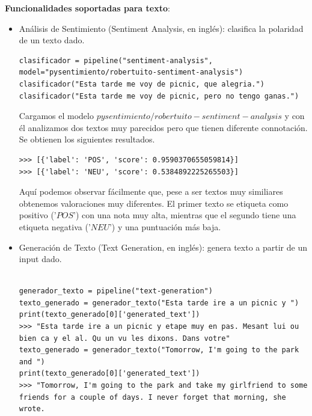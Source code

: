 \textbf{Funcionalidades soportadas para texto}:
\begin{itemize}
	\item Análisis de Sentimiento (Sentiment Analysis, en inglés): clasifica la polaridad de un texto dado.
	
	\begin{lstlisting}[style=SpyderStyle, caption={Análisis de sentimientos con Transformers}, captionpos=b, label={lst:python},breaklines = true]
clasificador = pipeline("sentiment-analysis", model="pysentimiento/robertuito-sentiment-analysis")
clasificador("Esta tarde me voy de picnic, que alegria.")
clasificador("Esta tarde me voy de picnic, pero no tengo ganas.")
	\end{lstlisting}
	
	Cargamos el modelo $pysentimiento/robertuito-sentiment-analysis$ y con él analizamos dos textos muy parecidos pero que tienen diferente connotación. Se obtienen los siguientes resultados. 
	\begin{lstlisting}[style=SpyderStyle, caption={Resultados del análisis de sentimientos}, captionpos=b, label={lst:python},breaklines = true]
>>> [{'label': 'POS', 'score': 0.9590370655059814}]
>>> [{'label': 'NEU', 'score': 0.5384892225265503}]
	\end{lstlisting}
	
Aquí podemos observar fácilmente que, pese a ser textos muy similiares obtenemos valoraciones muy diferentes. El primer texto se etiqueta como positivo ('$POS$') con una nota muy alta, mientras que el segundo tiene una etiqueta negativa ('$NEU$') y una puntuación más baja. 
	
	\item Generación de Texto (Text Generation, en inglés): genera texto a partir de un input dado.
\begin{lstlisting}[style=SpyderStyle, caption={Generación de texto con transformers}, captionpos=b, label={lst:python},breaklines = true]

generador_texto = pipeline("text-generation")
texto_generado = generador_texto("Esta tarde ire a un picnic y ")
print(texto_generado[0]['generated_text'])
>>> "Esta tarde ire a un picnic y etape muy en pas. Mesant lui ou bien ca y el al. Qu un vu les dixons. Dans votre"
texto_generado = generador_texto("Tomorrow, I'm going to the park and ")
print(texto_generado[0]['generated_text'])
>>> "Tomorrow, I'm going to the park and take my girlfriend to some friends for a couple of days. I never forget that morning, she wrote.


\end{lstlisting}
\end{itemize}
